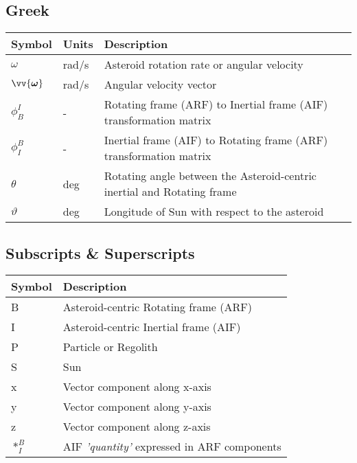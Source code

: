 \subsection*{Greek}
\begin{longtable}[l]{p{100pt} p{70pt} p{150pt}}
    \textbf{Symbol} & \textbf{Units} & \textbf{Description}                                 \\
    \hline
    $\omega$            & rad/s           & Asteroid rotation rate or angular
                                            velocity                                        \\
    $\vv{\bm{\omega}}$  & rad/s           & Angular velocity vector                         \\
    $\phi_{B}^{I}$      & -               & Rotating frame (ARF) to Inertial frame (AIF)
                                            transformation matrix                           \\
    $\phi_{I}^{B}$      & -               & Inertial frame (AIF) to Rotating frame (ARF)
                                            transformation matrix                           \\
    $\theta$            & deg             & Rotating angle between the Asteroid-centric
                                            inertial and Rotating frame                     \\
    $\vartheta$         & deg             & Longitude of Sun with respect to the asteroid   \\
\end{longtable}
\vspace{1cm}

\subsection*{Subscripts \& Superscripts}
\begin{longtable}[l]{p{100pt} p{230pt}}
    \textbf{Symbol} & \textbf{Description}                                              \\
    \hline
    B                                 & Asteroid-centric Rotating frame (ARF)           \\
    I                                 & Asteroid-centric Inertial frame (AIF)           \\
    P                                 & Particle or Regolith                            \\
    S                                 & Sun                                             \\
    x                                 & Vector component along x-axis                   \\
    y                                 & Vector component along y-axis                   \\
    z                                 & Vector component along z-axis                   \\
    $\ast_{I}^{B}$                    & AIF \textit{'quantity'} expressed
                                        in ARF components                               \\
\end{longtable}

